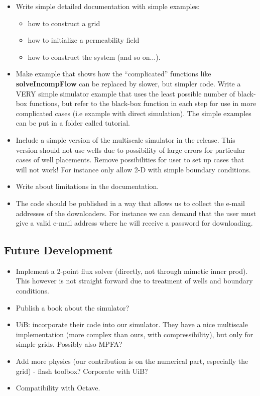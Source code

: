\documentclass[11pt,twoside,english]{scrartcl}
\begin{document}
\begin{itemize}
\item Write simple detailed documentation with simple examples:
\begin{itemize}
\item how to construct a grid
\item how to initialize a permeability field
\item how to construct the system (and so on...). 
\end{itemize}

\item Make example that shows how the ``complicated'' functions like
\textbf{solveIncompFlow} can be replaced by slower, but simpler code. Write a
VERY simple simulator example that uses the least possible number of
black-box functions, but refer to the black-box function in each step
for use in more complicated cases (i.e example with direct
simulation). The simple examples can be put in a folder called
tutorial.

\item Include a simple version of the multiscale simulator in the
  release. This version should not use wells due to possibility of large
  errors for particular cases of well placements. Remove possibilities
  for user to set up cases that will not work! For instance only allow
  2-D with simple boundary conditions. 

\item Write about limitations in the documentation.

\item The code should be published in a way that allows us to collect
  the e-mail addresses of the downloaders. For instance we can demand
  that the user must give a valid e-mail address where he will receive a
password for downloading. 
\end{itemize}

\subsection{Future Development}

\begin{itemize}
\item Implement a 2-point flux solver (directly, not through
mimetic inner prod). This however is not straight forward due to
treatment of wells and boundary conditions. 

\item Publish a book about the simulator?

\item UiB: incorporate their code into our simulator. They have a nice
multiscale implementation (more complex than ours, with
compressibility), but only for simple grids. Possibly also MPFA?

\item Add more physics (our contribution is on the numerical part, especially
the grid) - flash toolbox? Corporate with UiB?

\item Compatibility with Octave. 


\end{itemize}
\end{document}
